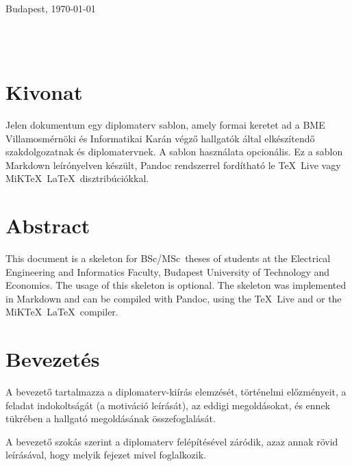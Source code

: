 \documentclass[11pt,magyar,a4paper,oneside,]{report}
\begin{document}
\begin{flushleft}
\vspace*{1cm}
Budapest, \today
\end{flushleft}

\begin{flushright}
 \vspace*{1cm}
 \makebox[7cm]{\rule{6cm}{.4pt}}\\
 \\
\end{flushright}
\thispagestyle{empty}

\vfill
\clearpage
\thispagestyle{empty} %

\chapter*{Kivonat}\label{kivonat}

Jelen dokumentum egy diplomaterv sablon, amely formai keretet ad a BME
Villamosmérnöki és Informatikai Karán végző hallgatók által elkészítendő
szakdolgozatnak és diplomatervnek. A sablon használata opcionális. Ez a
sablon Markdown leírónyelven készült, Pandoc rendszerrel fordítható le
\TeX~Live vagy MiK\TeX~\LaTeX~disztribúciókkal.

\chapter*{Abstract}\label{abstract}

This document is a skeleton for BSc/MSc~theses of students at the
Electrical Engineering and Informatics Faculty, Budapest University of
Technology and Economics. The usage of this skeleton is optional. The
skeleton was implemented in Markdown and can be compiled with Pandoc,
using the \TeX~Live and or the MiK\TeX~\LaTeX~compiler.

\chapter{Bevezetés}\label{bevezetuxe9s}

A bevezető tartalmazza a diplomaterv-kiírás elemzését, történelmi
előzményeit, a feladat indokoltságát (a motiváció leírását), az eddigi
megoldásokat, és ennek tükrében a hallgató megoldásának összefoglalását.

A bevezető szokás szerint a diplomaterv felépítésével záródik, azaz
annak rövid leírásával, hogy melyik fejezet mivel foglalkozik.
\end{document}
